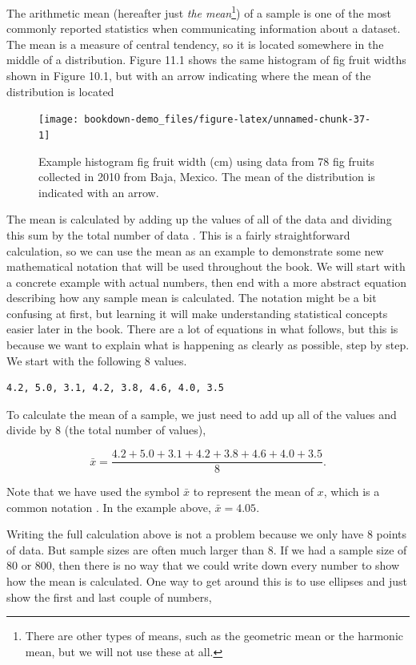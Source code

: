 \documentclass[
  openany]{krantz}
\begin{document}
The arithmetic mean (hereafter just \emph{the mean}\footnote{There are other types of means, such as the geometric mean or the harmonic mean, but we will not use these at all.}) of a sample is one of the most commonly reported statistics when communicating information about a dataset.
The mean is a measure of central tendency, so it is located somewhere in the middle of a distribution.
Figure 11.1 shows the same histogram of fig fruit widths shown in Figure 10.1, but with an arrow indicating where the mean of the distribution is located

\begin{figure}
\texttt{[image: bookdown-demo\_files/figure-latex/unnamed-chunk-37-1]} \caption{Example histogram fig fruit width (cm) using data from 78 fig fruits collected in 2010 from Baja, Mexico. The mean of the distribution is indicated with an arrow.}\label{fig:unnamed-chunk-37}
\end{figure}

The mean is calculated by adding up the values of all of the data and dividing this sum by the total number of data \citep{Sokal1995}.
This is a fairly straightforward calculation, so we can use the mean as an example to demonstrate some new mathematical notation that will be used throughout the book.
We will start with a concrete example with actual numbers, then end with a more abstract equation describing how any sample mean is calculated.
The notation might be a bit confusing at first, but learning it will make understanding statistical concepts easier later in the book.
There are a lot of equations in what follows, but this is because we want to explain what is happening as clearly as possible, step by step.
We start with the following 8 values.

\begin{verbatim}
4.2, 5.0, 3.1, 4.2, 3.8, 4.6, 4.0, 3.5
\end{verbatim}

To calculate the mean of a sample, we just need to add up all of the values and divide by 8 (the total number of values),

\[\bar{x} = \frac{4.2 + 5.0 + 3.1 + 4.2 + 3.8 + 4.6 + 4.0 + 3.5}{8}.\]

Note that we have used the symbol \(\bar{x}\) to represent the mean of \(x\), which is a common notation \citep{Sokal1995}.
In the example above, \(\bar{x} = 4.05\).

Writing the full calculation above is not a problem because we only have 8 points of data.
But sample sizes are often much larger than 8.
If we had a sample size of 80 or 800, then there is no way that we could write down every number to show how the mean is calculated.
One way to get around this is to use ellipses and just show the first and last couple of numbers,
\end{document}
